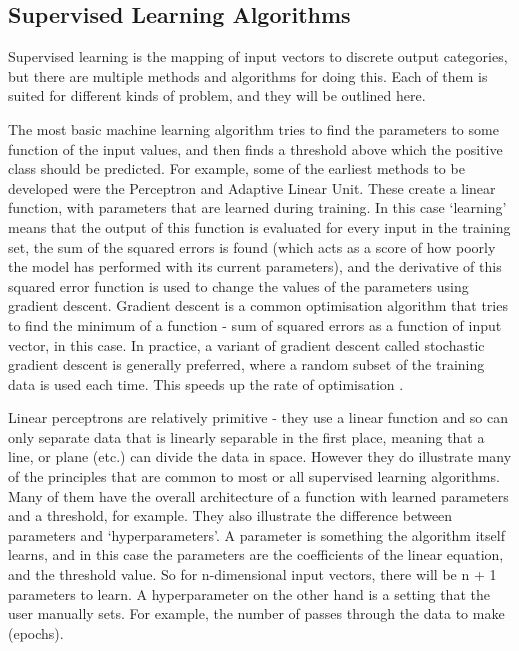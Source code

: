 \subsection{Supervised Learning Algorithms}

Supervised learning is the mapping of input vectors to discrete output categories, but there are multiple methods and algorithms for doing this. Each of them is suited for different kinds of problem, and they will be outlined here.

The most basic machine learning algorithm tries to find the parameters to some function of the input values, and then finds a threshold above which the positive class should be predicted. For example, some of the earliest methods to be developed were the Perceptron and Adaptive Linear Unit. These create a linear function, with parameters that are learned during training. In this case `learning' means that the output of this function is evaluated for every input in the training set, the sum of the squared errors is found (which acts as a score of how poorly the model has performed with its current parameters), and the derivative of this squared error function is used to change the values of the parameters using gradient descent. Gradient descent is a common optimisation algorithm that tries to find the minimum of a function - sum of squared errors as a function of input vector, in this case. In practice, a variant of gradient descent called stochastic gradient descent is generally preferred, where a random subset of the training data is used each time. This speeds up the rate of optimisation .

Linear perceptrons are relatively primitive - they use a linear function and so can only separate data that is linearly separable in the first place, meaning that a line, or plane (etc.) can divide the data in space. However they do illustrate many of the principles that are common to most or all supervised learning algorithms. Many of them have the overall architecture of a function with learned parameters and a threshold, for example. They also illustrate the difference between parameters and `hyperparameters'. A parameter is something the algorithm itself learns, and in this case the parameters are the coefficients of the linear equation, and the threshold value. So for n-dimensional input vectors, there will be n + 1 parameters to learn. A hyperparameter on the other hand is a setting that the user manually sets. For example, the number of passes through the data to make (epochs).


